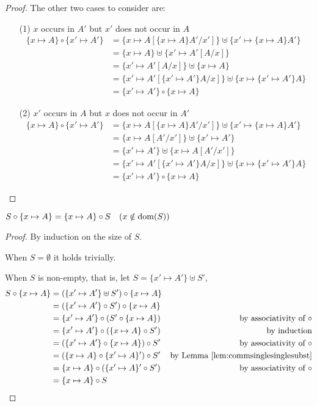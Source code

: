 \begin{proof}
The other two cases to consider are:
\begin{itemize}
\item[(1)] $x$ occurs in $A'$ but $x'$ does not occur in $A$
\begin{align*}
\{x\mapsto A\}\circ\{x'\mapsto A'\}
&= \{x\mapsto A[\{x\mapsto A\} A'/x']\}\uplus\{x'\mapsto\{x\mapsto A\} A'\} \\
&= \{x\mapsto A\}\uplus\{x'\mapsto A'[A/x]\} \\
&= \{x'\mapsto A'[A/x]\}\uplus\{x\mapsto A\} \\
&= \{x'\mapsto A'[\{x'\mapsto A'\}A/x]\}\uplus\{x\mapsto\{x'\mapsto A'\}A\} \\
&= \{x'\mapsto A'\}\circ\{x\mapsto A\}
\end{align*}
\item[(2)] $x'$ occurs in $A$ but $x$ does not occur in $A'$
\begin{align*}
\{x\mapsto A\}\circ\{x'\mapsto A'\}
&= \{x\mapsto A[\{x\mapsto A\} A'/x']\}\uplus\{x'\mapsto\{x\mapsto A\} A'\} \\
&= \{x\mapsto A[A'/x']\}\uplus\{x'\mapsto A'\} \\
&= \{x'\mapsto A'\}\uplus\{x\mapsto A[A'/x']\} \\
&= \{x'\mapsto A'[\{x'\mapsto A'\}A/x]\}\uplus\{x\mapsto\{x'\mapsto A'\}A\} \\
&= \{x'\mapsto A'\}\circ\{x\mapsto A\}
\end{align*}
\end{itemize}
\end{proof}

\begin{lemma}\label{lem:commsingletonsubst}
	$S \circ \{x\mapsto A\} = \{x\mapsto A\} \circ S
	\quad (x \notin \mathop{\mathrm{dom}}(S))$
\end{lemma}
\begin{proof} By induction on the size of $S$.

When $S=\emptyset$ it holds trivially.

When $S$ is non-empty, that is, let $S=\{x'\mapsto A'\}\uplus S'$,
\begin{align*}
S\circ\{x\mapsto A\}
&= (\{x'\mapsto A'\}\uplus S') \circ \{x\mapsto A\} \\
&= (\{x'\mapsto A'\}\circ S') \circ \{x\mapsto A\} \\
&= \{x'\mapsto A'\} \circ (S' \circ \{x\mapsto A\})
& \text{by associativity of $\circ$} \\
&= \{x'\mapsto A'\} \circ (\{x\mapsto A\} \circ S')
& \text{by induction} \\
&= (\{x'\mapsto A'\} \circ \{x\mapsto A\}) \circ S'
& \text{by associativity of $\circ$} \\
&= (\{x\mapsto A\} \circ \{x'\mapsto A\}') \circ S'
& \text{by Lemma \ref{lem:commsinglesinglesubst}} \\
&= \{x\mapsto A\} \circ (\{x'\mapsto A\}' \circ S')
& \text{by associativity of $\circ$} \\
&= \{x\mapsto A\} \circ S
\end{align*}
\end{proof}

